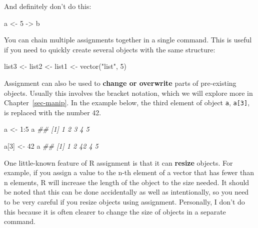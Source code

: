 \documentclass[
  13,
  letterpaper,
]{report}
\newenvironment{Shaded}{\begin{snugshade}}{\end{snugshade}}
\newcommand{\DecValTok}[1]{\textcolor[rgb]{0.68,0.00,0.00}{#1}}
\newcommand{\DocumentationTok}[1]{\textcolor[rgb]{0.37,0.37,0.37}{\textit{#1}}}
\newcommand{\FunctionTok}[1]{\textcolor[rgb]{0.28,0.35,0.67}{#1}}
\newcommand{\NormalTok}[1]{\textcolor[rgb]{0.00,0.23,0.31}{#1}}
\newcommand{\OtherTok}[1]{\textcolor[rgb]{0.00,0.23,0.31}{#1}}
\newcommand{\SpecialCharTok}[1]{\textcolor[rgb]{0.37,0.37,0.37}{#1}}
\newcommand{\StringTok}[1]{\textcolor[rgb]{0.13,0.47,0.30}{#1}}
\begin{document}
And definitely don't do this:

\begin{Shaded}
\begin{Highlighting}[]
\NormalTok{a }\OtherTok{\textless{}{-}} \DecValTok{5} \OtherTok{{-}\textgreater{}}\NormalTok{ b}
\end{Highlighting}
\end{Shaded}

You can chain multiple assignments together in a single command. This is
useful if you need to quickly create several objects with the same
structure:

\begin{Shaded}
\begin{Highlighting}[]
\NormalTok{list3 }\OtherTok{\textless{}{-}}\NormalTok{ list2 }\OtherTok{\textless{}{-}}\NormalTok{ list1 }\OtherTok{\textless{}{-}} \FunctionTok{vector}\NormalTok{(}\StringTok{"list"}\NormalTok{, }\DecValTok{5}\NormalTok{)}
\end{Highlighting}
\end{Shaded}

Assignment can also be used to \textbf{change or overwrite} parts of
pre-existing objects. Usually this involves the bracket notation, which
we will explore more in Chapter~\ref{sec-manip}. In the example below,
the third element of object \texttt{a}, \texttt{a{[}3{]}}, is replaced
with the number 42.

\begin{Shaded}
\begin{Highlighting}[]
\NormalTok{a }\OtherTok{\textless{}{-}} \DecValTok{1}\SpecialCharTok{:}\DecValTok{5}
\NormalTok{a}
\DocumentationTok{\#\# [1] 1 2 3 4 5}

\NormalTok{a[}\DecValTok{3}\NormalTok{] }\OtherTok{\textless{}{-}} \DecValTok{42}
\NormalTok{a}
\DocumentationTok{\#\# [1]  1  2 42  4  5}
\end{Highlighting}
\end{Shaded}

One little-known feature of R assignment is that it can \textbf{resize}
objects. For example, if you assign a value to the n-th element of a
vector that has fewer than n elements, R will increase the length of the
object to the size needed. It should be noted that this can be done
accidentally as well as intentionally, so you need to be very careful if
you resize objects using assignment. Personally, I don't do this because
it is often clearer to change the size of objects in a separate command.
\end{document}
